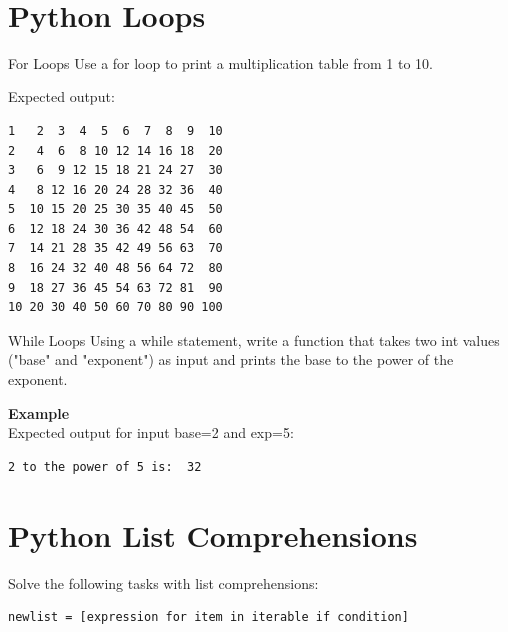 \documentclass[twoside]{article}
\begin{document}
\maketitle
\vspace{10pt}
\\

\section{Python Loops}

\begin{task}{For Loops}{}{}
Use a for loop to print a multiplication table from 1 to 10.

\vspace{10pt}
Expected output:
\begin{lstlisting}[numbers=none]
1   2  3  4  5  6  7  8  9  10 		
2   4  6  8 10 12 14 16 18  20 		
3   6  9 12 15 18 21 24 27  30 		
4   8 12 16 20 24 28 32 36  40 		
5  10 15 20 25 30 35 40 45  50 		
6  12 18 24 30 36 42 48 54  60 		
7  14 21 28 35 42 49 56 63  70 		
8  16 24 32 40 48 56 64 72  80 		
9  18 27 36 45 54 63 72 81  90 		
10 20 30 40 50 60 70 80 90 100 
\end{lstlisting}

\end{task}

\begin{task}{While Loops}{}{}
Using a while statement, write a function that takes two int values ("base" and "exponent") as input and prints the base to the power of the exponent.

\vspace{10pt}
\textbf{Example}\\
Expected output for input base=2 and exp=5:
\begin{lstlisting}[numbers=none]
2 to the power of 5 is:  32
\end{lstlisting}

\end{task}

\clearpage
\section{Python List Comprehensions}

Solve the following tasks with list comprehensions:
\begin{lstlisting}[numbers=none]
newlist = [expression for item in iterable if condition] 
\end{lstlisting}
\end{document}
